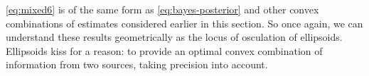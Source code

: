 \begin{comment}
Assume that our interest lies primarily in estimating the fixed-effect parameters in $\vec{\beta}$.  At one extreme
(complete pooling) we could simply ignore clusters and calculate the pooled OLS estimate,
\begin{equation}\label{eq:mixed4}
 \widehat{\vec{\beta}}^{\textrm{pooled}} = \inv{(\mat{X}\trans \mat{X})} \mat{X}\trans \vec{y}
 \quad\quad \textrm{with} \quad\quad
 \widehat{\mat{S}} \equiv \widehat{\Var}(\widehat{\vec{\beta}}^{\textrm{pooled}}) = \hat{\sigma}^2 \inv{(\mat{X}\trans \mat{X})} \period
\end{equation}
At the other extreme (no pooling), we can ignore the variation across clusters and calculate the
separate BLUE estimate within each cluster, giving the results of a fixed-effects analysis,
\begin{equation}\label{eq:mixed5}
 \widehat{\vec{\beta}}^{\textrm{unpooled}}_i = \inv{(\mat{X}_i\trans \mat{X}_i)} \mat{X}_i\trans \vec{y}_i
 \quad\quad \textrm{with} \quad\quad
 \widehat{\mat{S}}_i \equiv \widehat{\Var}(\widehat{\vec{\beta}}^{\textrm{unpooled}}_i) = \hat{\sigma}^2 \inv{(\mat{X}_i\trans \mat{X}_i)} \period
\end{equation}
Both extremes have drawbacks:  whereas the pooled analysis ignores variation among clusters, the unpooled analysis ignores the
cluster-averaged result and overstates variation within each cluster, making the clusters appear to differ more than they actually do.

This dilemma led to the development of BLUPs in models with random effects \citep{Henderson:1975,Robinson:1991,Speed:1991}.
In the case considered here, $\mat{Z}_i = \mat{X}_i$, and so $\widehat{\vec{u}}_i$ gives ``estimates'' of the random effects with
$\widehat{\Var} (\widehat{\vec{u}}_i) = \widehat{\mat{G}}$. The BLUPs are a weighted average of the $\widehat{\vec{\beta}}_i$
and $\widehat{\vec{u}}_i$ using the precision ($\Var^{-1}$) as weights,

\begin{equation}\label{eq:mixed6}
 \widetilde{\vec{\beta}}^{\textrm{blup}}_i =
 \left(
   \widehat{\vec{\beta}}^{\textrm{unpooled}}_i \inv{\widehat{\mat{S}}_i}  + \inv{\widehat{\vec{u}}_i \widehat{\mat{G}}}
 \right)
 \inv{ \left( \inv{\widehat{\mat{S}}_i} + \inv{\widehat{\mat{G}}} \right) } \period
\end{equation}
This ``partial pooling'' optimally combines the information from cluster $i$ with the information from all clusters,
shrinking the $\widehat{\vec{\beta}}_i$ toward $\widehat{\vec{\beta}}^{\textrm{pooled}}$. Shrinkage
for a given parameter $\beta_{ij}$ is greater
when the sample size $n_i$ is small or when the estimated variance of the corresponding 
random effect, $g_{jj}$, is small.
\end{comment}


\eqref{eq:mixed6}
is of the same form as \eqref{eq:bayes-posterior} and other convex combinations of estimates considered
earlier in this section. So once again, we can understand these results geometrically as the locus of
osculation of ellipsoids. Ellipsoids kiss for a reason: to provide an optimal 
convex combination of information from two sources, taking precision into account.



